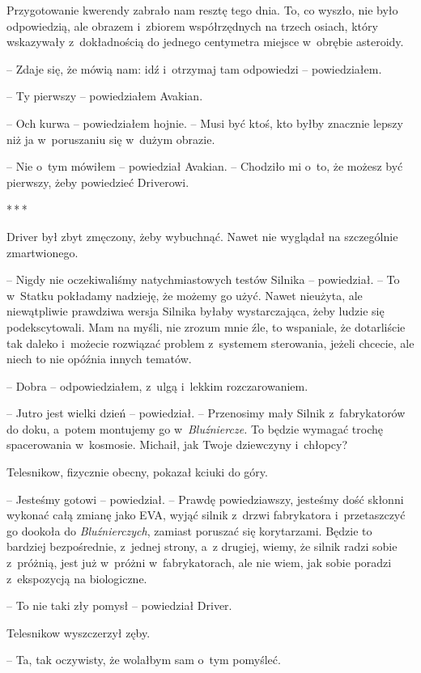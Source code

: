\documentclass[oneside,polish,12pt,sfheadings]{mwbk}
\newcommand{\threeast}{\bigskip\par\centerline{*\,*\,*}\medskip\par}%
\begin{document}
Przygotowanie kwerendy zabrało nam resztę tego dnia. To, co wyszło, nie
było odpowiedzią, ale obrazem i~zbiorem współrzędnych na trzech osiach,
który wskazywały z~dokładnością do jednego centymetra miejsce w~obrębie
asteroidy.

-- Zdaje się, że mówią nam: idź i~otrzymaj tam odpowiedzi -- powiedziałem.

-- Ty pierwszy -- powiedziałem Avakian.

-- Och kurwa -- powiedziałem hojnie. -- Musi być ktoś, kto byłby znacznie
lepszy niż ja w~poruszaniu się w~dużym obrazie.

-- Nie o~tym mówiłem -- powiedział Avakian. -- Chodziło mi o~to, że możesz
być pierwszy, żeby powiedzieć Driverowi.

\threeast

Driver był zbyt zmęczony, żeby wybuchnąć. Nawet nie wyglądał na
szczególnie zmartwionego.

-- Nigdy nie oczekiwaliśmy natychmiastowych testów Silnika -- powiedział.
-- To w~Statku pokładamy nadzieję, że możemy go użyć. Nawet nieużyta, ale
niewątpliwie prawdziwa wersja Silnika byłaby wystarczająca, żeby ludzie
się podekscytowali. Mam na myśli, nie zrozum mnie źle, to wspaniale, że
dotarliście tak daleko i~możecie rozwiązać problem z~systemem
sterowania, jeżeli chcecie, ale niech to nie opóźnia innych tematów.

-- Dobra -- odpowiedziałem, z~ulgą i~lekkim rozczarowaniem.

-- Jutro jest wielki dzień -- powiedział. -- Przenosimy mały Silnik z~fabrykatorów do doku, a~potem montujemy go w~\emph{Bluźniercze. } To
będzie wymagać trochę spacerowania w~kosmosie. Michaił, jak Twoje
dziewczyny i~chłopcy?

Telesnikow, fizycznie obecny, pokazał kciuki do góry.

-- Jesteśmy gotowi -- powiedział. -- Prawdę powiedziawszy, jesteśmy dość
skłonni wykonać całą zmianę jako EVA, wyjąć silnik z~drzwi fabrykatora i~przetaszczyć go dookoła do \emph{Bluźnierczych}, zamiast poruszać się
korytarzami. Będzie to bardziej bezpośrednie, z~jednej strony, a~z
drugiej, wiemy, że silnik radzi sobie z~próżnią, jest już w~próżni w~fabrykatorach, ale nie wiem, jak sobie poradzi z~ekspozycją na
biologiczne.

-- To nie taki zły pomysł -- powiedział Driver.

Telesnikow wyszczerzył zęby. 

-- Ta, tak oczywisty, że wolałbym sam o~tym
pomyśleć.
\end{document}
